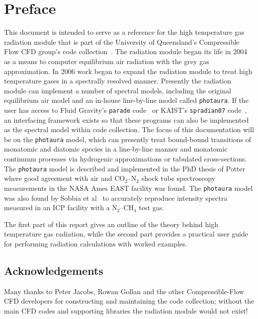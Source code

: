 \chapter*{Preface}

This document is intended to serve as a reference for the high temperature gas radiation module that is part of the University of Queensland's Compressible Flow CFD group's code collection~\cite{cfcfd}.
The radiation module began its life in 2004 as a means to computer equilibrium air radiation with the grey gas approximation.
In 2006 work began to expand the radiation module to treat high temperature gases in a spectrally resolved manner.
Presently the radiation module can implement a number of spectral models, including the original equilibrium air model and an in-house line-by-line model called \texttt{photaura}.
If the user has access to Fluid Gravity's \texttt{parade} code~\cite{SBF+11} or KAIST's \texttt{spradian07} code~\cite{hyun_phd}, an interfacing framework exists so that these programs can also be implemented as the spectral model within code collection.  
The focus of this documentation will be on the \texttt{photaura} model, which can presently treat bound-bound transitions of monatomic and diatomic species in a line-by-line manner and monatomic continuum processes via hydrogenic approximations or tabulated cross-sections.
The \texttt{photaura} model is described and implemented in the PhD thesis of Potter~\cite{Potter_PhD} where good agreement with air and CO$_2$--N$_2$ shock tube spectroscopy measurements in the NASA Ames EAST facility was found.  
The \texttt{photaura} model was also found by Sobbia et al~\cite{SLB+2012} to accurately reproduce intensity spectra measured in an ICP facility with a N$_2$--CH$_4$ test gas.

\par

The first part of this report gives an outline of the theory behind high temperature gas radiation, while the second part provides a practical user guide for performing radiation calculations with worked examples.


\section*{Acknowledgements}

Many thanks to Peter Jacobs, Rowan Gollan and the other Compressible-Flow CFD developers for constructing and maintaining the code collection; without the main CFD codes and supporting libraries the radiation module would not exist!